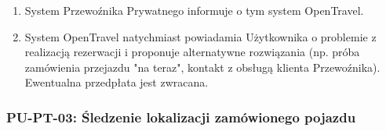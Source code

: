 \documentclass[a4paper,12pt]{article}
\begin{document}
\begin{itemize}
\begin{itemize}
\begin{enumerate}
                     \item System Przewoźnika Prywatnego informuje o tym system OpenTravel.
                     \item System OpenTravel natychmiast powiadamia Użytkownika o problemie z realizacją rezerwacji i proponuje alternatywne rozwiązania (np. próba zamówienia przejazdu "na teraz", kontakt z obsługą klienta Przewoźnika). Ewentualna przedpłata jest zwracana.
                 \end{enumerate}
        \end{itemize}
\end{itemize}

\subsubsection{PU-PT-03: Śledzenie lokalizacji zamówionego pojazdu}
\end{document}
